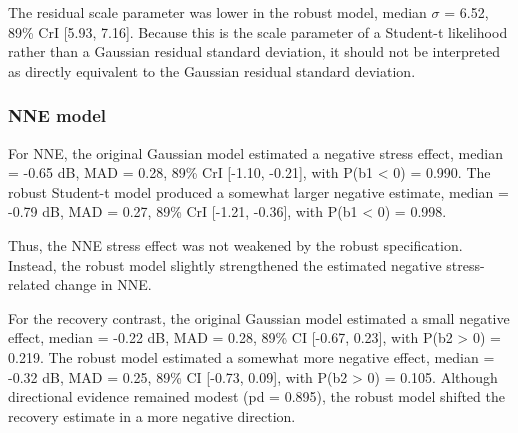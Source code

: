 \documentclass[
  english,
  man,floatsintext]{apa6}
\begin{document}
The residual scale parameter was lower in the robust model, median \(\sigma\) = 6.52, 89\% CrI {[}5.93, 7.16{]}. Because this is the scale parameter of a Student-t likelihood rather than a Gaussian residual standard deviation, it should not be interpreted as directly equivalent to the Gaussian residual standard deviation.

\subsubsection{NNE model}\label{nne-model}

For NNE, the original Gaussian model estimated a negative stress effect, median = -0.65 dB, MAD = 0.28, 89\% CrI {[}-1.10, -0.21{]}, with P(b1 \textless{} 0) = 0.990. The robust Student-t model produced a somewhat larger negative estimate, median = -0.79 dB, MAD = 0.27, 89\% CrI {[}-1.21, -0.36{]}, with P(b1 \textless{} 0) = 0.998.

Thus, the NNE stress effect was not weakened by the robust specification. Instead, the robust model slightly strengthened the estimated negative stress-related change in NNE.

For the recovery contrast, the original Gaussian model estimated a small negative effect, median = -0.22 dB, MAD = 0.28, 89\% CI {[}-0.67, 0.23{]}, with P(b2 \textgreater{} 0) = 0.219. The robust model estimated a somewhat more negative effect, median = -0.32 dB, MAD = 0.25, 89\% CI {[}-0.73, 0.09{]}, with P(b2 \textgreater{} 0) = 0.105. Although directional evidence remained modest (pd = 0.895), the robust model shifted the recovery estimate in a more negative direction.

\begin{table}[!h]
\centering
\caption{\label{tab:table-nne-main-effects-robust}Comparison of Gaussian and robust Student-t main-effects models for NNE.}
\centering
{}
\end{table}
\end{document}
